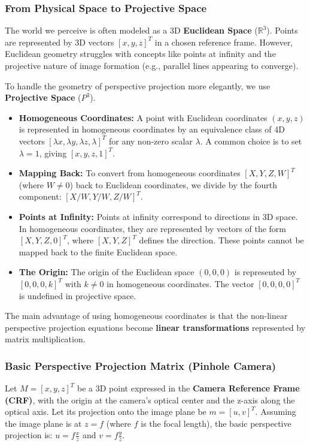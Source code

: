 \documentclass{article}
\begin{document}
\subsubsection{From Physical Space to Projective Space}

The world we perceive is often modeled as a 3D \textbf{Euclidean Space} ($\mathbb{R}^3$). Points are represented by 3D vectors $[x, y, z]^T$ in a chosen reference frame. However, Euclidean geometry struggles with concepts like points at infinity and the projective nature of image formation (e.g., parallel lines appearing to converge).

To handle the geometry of perspective projection more elegantly, we use \textbf{Projective Space} ($P^3$).
\begin{itemize}
    \item \textbf{Homogeneous Coordinates:} A point with Euclidean coordinates $(x, y, z)$ is represented in homogeneous coordinates by an equivalence class of 4D vectors $[\lambda x, \lambda y, \lambda z, \lambda]^T$ for any non-zero scalar $\lambda$. A common choice is to set $\lambda=1$, giving $[x, y, z, 1]^T$.
    \item \textbf{Mapping Back:} To convert from homogeneous coordinates $[X, Y, Z, W]^T$ (where $W \neq 0$) back to Euclidean coordinates, we divide by the fourth component: $[X/W, Y/W, Z/W]^T$.
    \item \textbf{Points at Infinity:} Points at infinity correspond to directions in 3D space. In homogeneous coordinates, they are represented by vectors of the form $[X, Y, Z, 0]^T$, where $[X, Y, Z]^T$ defines the direction. These points cannot be mapped back to the finite Euclidean space.
    \item \textbf{The Origin:} The origin of the Euclidean space $(0,0,0)$ is represented by $[0, 0, 0, k]^T$ with $k \neq 0$ in homogeneous coordinates. The vector $[0, 0, 0, 0]^T$ is undefined in projective space.
\end{itemize}
The main advantage of using homogeneous coordinates is that the non-linear perspective projection equations become \textbf{linear transformations} represented by matrix multiplication.

\subsubsection{Basic Perspective Projection Matrix (Pinhole Camera)}

Let $M = [x, y, z]^T$ be a 3D point expressed in the \textbf{Camera Reference Frame (CRF)}, with the origin at the camera's optical center and the z-axis along the optical axis. Let its projection onto the image plane be $m = [u, v]^T$. Assuming the image plane is at $z=f$ (where $f$ is the focal length), the basic perspective projection is:
$u = f \frac{x}{z}$ and $v = f \frac{y}{z}$.
\end{document}

